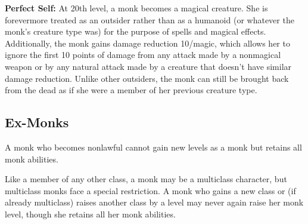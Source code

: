 \textbf{Perfect Self:} At 20th level, a monk becomes a magical creature. She is 
forevermore treated as an outsider rather than as a humanoid (or whatever the monk's 
creature type was) for the purpose of spells and magical effects. Additionally, 
the monk gains damage reduction 10/magic, which allows her to ignore the first 
10 points of damage from any attack made by a nonmagical weapon or by any natural 
attack made by a creature that doesn't have similar damage reduction. Unlike other 
outsiders, the monk can still be brought back from the dead as if she were a member 
of her previous creature type.

\subsection{Ex-Monks}

A monk who becomes nonlawful cannot gain new levels as a monk but retains all monk 
abilities.

Like a member of any other class, a monk may be a multiclass character, but multiclass 
monks face a special restriction. A monk who gains a new class or (if already multiclass) 
raises another class by a level may never again raise her monk level, though she 
retains all her monk abilities.